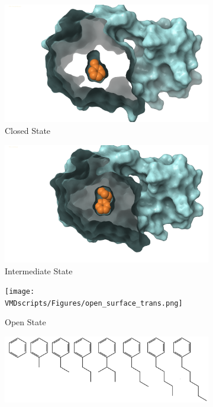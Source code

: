 \documentclass[T4paper.tex]{subfiles}
\begin{document}
\begin{figure}[!ht]
\begin{subfigure}{0.33\textwidth}
   \centering
   \caption{Closed State}
   \label{fig:closed_surface}
   \includegraphics[trim={5cm 3cm 5cm 2cm}, clip, width=\linewidth, height=0.25\textheight]{VMDscripts/Figures/closed_surface_trans.png}
\end{subfigure}\hfill
\centering
\begin{subfigure}{0.33\textwidth}
  \centering
   \caption{Intermediate State}
   \label{fig:int_surface}
   \includegraphics[trim={5cm 3cm 5cm 2cm}, clip, width=\linewidth, height=0.25\textheight]{VMDscripts/Figures/int_surface_trans.png}
\end{subfigure}\hfill
\centering
\begin{subfigure}{0.33\textwidth}
   \centering
   \caption{Open State}
   \label{fig:open_surface}
   \texttt{[image: VMDscripts/Figures/open\_surface\_trans.png]}
\end{subfigure}
\centering
\begin{subfigure}{0.75\textwidth}
   \centering
   \includegraphics[clip, width=\textwidth, height=0.12\textheight]{VMDscripts/Figures/2D-ligands/ligand_set.png}

\end{subfigure}
\end{figure}
\end{document}
